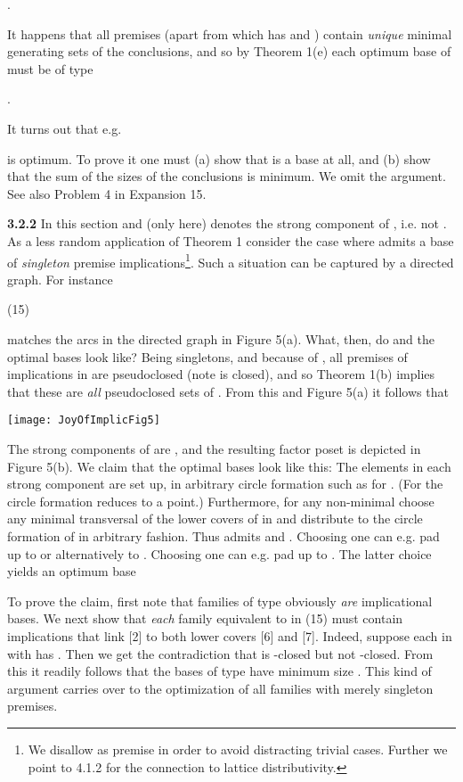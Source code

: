 \documentclass[11pt]{article}
\begin{document}
.

It happens that all premises (apart from  which has  and ) contain {\it unique} minimal generating sets of the conclusions, and so by Theorem 1(e) each optimum base of  must be of type

.

It turns out that e.g.



is optimum. To prove it one must (a) show that  is a base at all, and (b) show that the sum  of the sizes of the conclusions is minimum. We omit the argument. See also Problem 4 in Expansion 15.


{\bf 3.2.2} In this section and (only here)  denotes the strong component of , i.e. not . As a less random application of Theorem 1 consider the case where  admits a base  of {\it singleton} premise implications\footnote{We disallow  as premise in order to avoid distracting trivial cases. Further we point to 4.1.2 for the connection to lattice distributivity.}.  Such a situation can be captured by a directed graph. For instance

(15) \quad 

matches the arcs in the directed graph  in Figure 5(a). What, then, do  and the optimal bases  look like? Being singletons, and because of , all premises of implications in  are pseudoclosed (note  is closed), and so Theorem 1(b) implies that these are {\it all} pseudoclosed sets of . From this and Figure 5(a) it follows that



\begin{center}
\texttt{[image: JoyOfImplicFig5]}
\end{center}


The strong components of  are ,  and the resulting factor poset  is depicted in Figure 5(b). We claim that the optimal bases  look like this: The elements in each strong component  are set up, in arbitrary circle formation such as  for . (For  the circle formation reduces to a point.) Furthermore, for any non-minimal  choose any minimal transversal  of the lower covers of  in  and distribute  to the circle formation of  in arbitrary fashion. Thus  admits  and . Choosing  one can e.g. pad up  to  or alternatively  to . Choosing  one can e.g. pad up  to . The latter choice yields an optimum base

To prove the claim, first note that families of type  obviously {\it are} implicational bases. We next show that {\it each} family  equivalent to  in (15) must contain implications that link [2] to both lower covers [6] and [7]. Indeed, suppose each  in  with  has . Then we get the contradiction that  is -closed but not -closed. From this it readily follows that the bases of type  have minimum size . This kind of argument carries over to the optimization of all families  with merely singleton premises.
\end{document}
